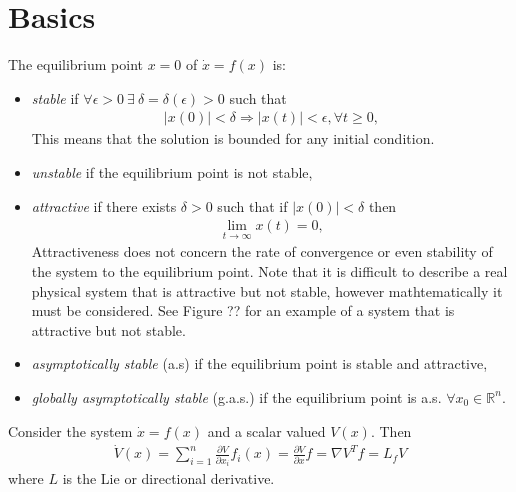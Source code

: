 
\mainmatter
\setcounter{page}{1}

\lectureseries[\course]{\course}

\date{January 26, 2010}

\setaddress

\setcounter{lecture}{6}
\setcounter{chapter}{6}


\section{Basics}
\begin{definition}
The equilibrium point $x=0$ of $\dot{x}=f(x)$ is:
\begin{itemize}
\item \textit{stable} if $\forall \epsilon > 0 ~ \exists ~ \delta=\delta(\epsilon)>0$ such that
\begin{align*}
|x(0)| < \delta \Rightarrow |x(t)| < \epsilon, \forall t\geq0,
\end{align*}
This means that the solution is bounded for any initial condition.
\item \textit{unstable} if the equilibrium point is not stable,
\item \textit{attractive} if there exists $\delta>0$ such that if $|x(0)|<\delta$ then
\begin{align*}
\lim_{t\to\infty}x(t) = 0,
\end{align*}
Attractiveness does not concern the rate of convergence or even stability of the system to the equilibrium point. Note that it is difficult to describe a real physical system that is attractive but not stable, however mathtematically it must be considered. See Figure ?? for an example of a system that is attractive but not stable.
\item \textit{asymptotically stable} (a.s) if the equilibrium point is stable and attractive,
\item \textit{globally asymptotically stable} (g.a.s.) if the equilibrium point is a.s. $\forall x_0\in\mathbb{R}^n$.
\end{itemize}
\end{definition}

\begin{definition}
Consider the system $\dot{x}=f(x)$ and a scalar valued $V(x)$. Then
\begin{align*}
\dot{V}(x) = \sum_{i=1}^n \frac{\partial V}{\partial x_i} f_i(x) = \frac{\partial V}{\partial x}f = \nabla V^Tf = L_fV
\end{align*}
where $L$ is the Lie or directional derivative.
\end{definition}

